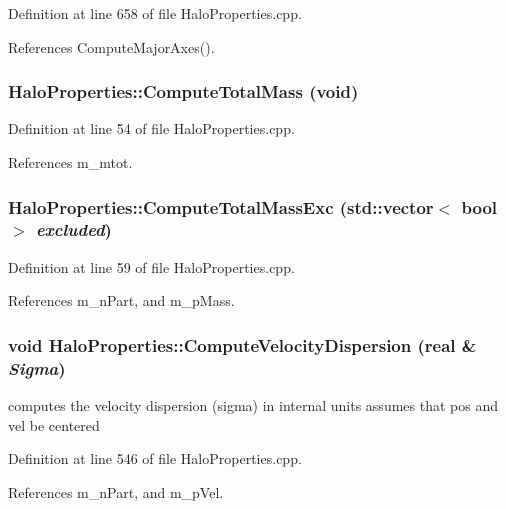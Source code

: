 Definition at line 658 of file HaloProperties.cpp.



References ComputeMajorAxes().

\subsubsection[{ComputeTotalMass}]{ HaloProperties::ComputeTotalMass (void)}\label{classHaloProperties_a06a1cd86f4973cd6c81b47a5712fcac8}


Definition at line 54 of file HaloProperties.cpp.



References m\_\-mtot.

\subsubsection[{ComputeTotalMassExc}]{ HaloProperties::ComputeTotalMassExc (std::vector$<$ bool $>$ {\em excluded})}\label{classHaloProperties_af1a876c4064a4e86f74d3585b6f68030}


Definition at line 59 of file HaloProperties.cpp.



References m\_\-nPart, and m\_\-pMass.

\subsubsection[{ComputeVelocityDispersion}]{\setlength{\rightskip}{0pt plus 5cm}void HaloProperties::ComputeVelocityDispersion ({\bf real} \& {\em Sigma})}\label{classHaloProperties_a609180764606ba7ab3658b545e89c7f0}
computes the velocity dispersion (sigma) in internal units assumes that pos and vel be centered 

Definition at line 546 of file HaloProperties.cpp.



References m\_\-nPart, and m\_\-pVel.

